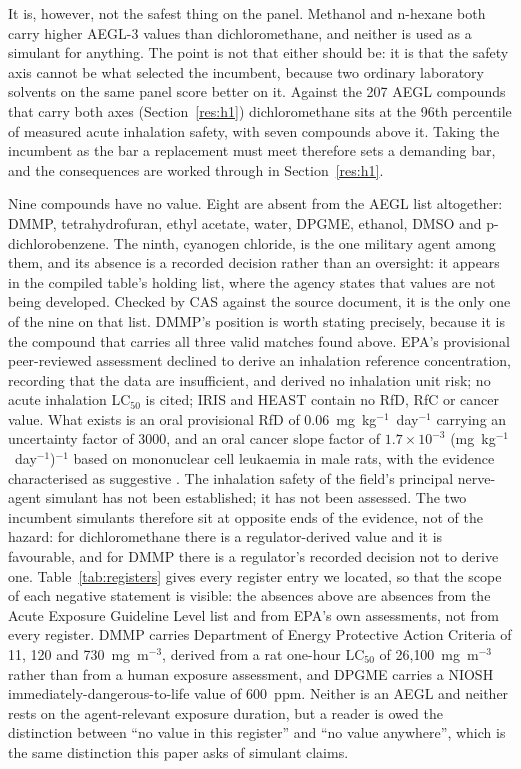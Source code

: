 \documentclass[11pt,a4paper]{article}
\begin{document}
It is, however, not the safest thing on the panel. Methanol and n-hexane both
carry higher AEGL-3 values than dichloromethane, and neither is used as a
simulant for anything. The point is not that either should be: it is that the
safety axis cannot be what selected the incumbent, because two ordinary
laboratory solvents on the same panel score better on it. Against the 207 AEGL
compounds that carry both axes (Section~\ref{res:h1}) dichloromethane sits at
the 96th percentile of measured acute inhalation safety, with seven compounds
above it. Taking the incumbent as the bar a replacement must meet therefore sets
a demanding bar, and the consequences are worked through in
Section~\ref{res:h1}.

Nine compounds have no value. Eight are absent from the AEGL list altogether:
DMMP, tetrahydrofuran, ethyl acetate, water, DPGME, ethanol, DMSO and
p-dichlorobenzene. The ninth, cyanogen chloride, is the one military agent
among them, and its absence is a recorded decision rather than an oversight: it
appears in the compiled table's holding list, where the agency states that
values are not being developed. Checked by CAS against the source document, it
is the only one of the nine on that list. DMMP's position is worth stating
precisely, because it is the compound
that carries all three valid matches found above. EPA's provisional
peer-reviewed assessment declined to derive an inhalation reference
concentration, recording that the data are insufficient, and derived no
inhalation unit risk; no acute inhalation LC$_{50}$ is cited; IRIS and HEAST
contain no RfD, RfC or cancer value. What exists is an oral provisional RfD of
0.06~mg~kg$^{-1}$~day$^{-1}$ carrying an uncertainty factor of 3000, and an oral
cancer slope factor of $1.7\times10^{-3}$ (mg~kg$^{-1}$~day$^{-1}$)$^{-1}$ based
on mononuclear cell leukaemia in male rats, with the evidence characterised as
suggestive \cite{epapprtv2006}. The inhalation safety of the field's principal
nerve-agent simulant has not been established; it has not been assessed. The two
incumbent simulants therefore sit at opposite ends of the evidence, not of the
hazard: for dichloromethane there is a regulator-derived value and it is
favourable, and for DMMP there is a regulator's recorded decision not to derive
one. Table~\ref{tab:registers} gives every register entry we located, so that
the scope of each negative statement is visible: the absences above are
absences from the Acute Exposure Guideline Level list and from EPA's own
assessments, not from every register. DMMP carries Department of Energy
Protective Action Criteria of 11, 120 and 730~mg~m$^{-3}$, derived from a rat
one-hour LC$_{50}$ of 26{,}100~mg~m$^{-3}$ rather than from a human exposure
assessment, and DPGME carries a NIOSH immediately-dangerous-to-life value of
600~ppm. Neither is an AEGL and neither rests on the agent-relevant exposure
duration, but a reader is owed the distinction between
``no value in this register'' and ``no value anywhere'', which is the same
distinction this paper asks of simulant claims.
\end{document}
